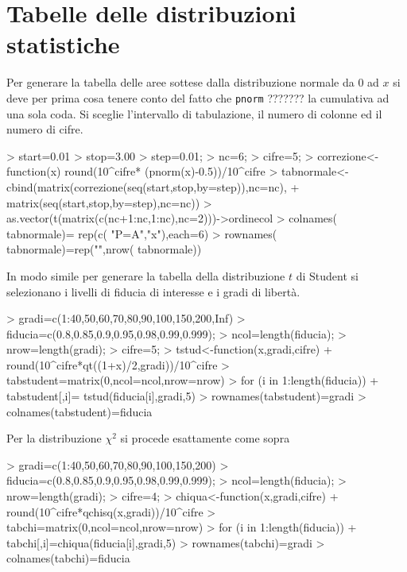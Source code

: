 \documentclass[onecolumn,11pt]{book}
\begin{document}
\section*{Tabelle delle distribuzioni statistiche}
Per generare la tabella delle aree sottese dalla distribuzione normale da 0 ad $x$ si deve per prima cosa tenere conto del fatto che \texttt{pnorm} ??????? la cumulativa ad una sola coda. Si sceglie l'intervallo di tabulazione, il numero di colonne ed il numero di cifre.
\begin{Schunk}
\begin{Sinput}
> start=0.01
> stop=3.00
> step=0.01;
> nc=6;
> cifre=5;
> correzione<-function(x)  round(10^cifre* (pnorm(x)-0.5))/10^cifre
>  tabnormale<-cbind(matrix(correzione(seq(start,stop,by=step)),nc=nc),
+  matrix(seq(start,stop,by=step),nc=nc))
> as.vector(t(matrix(c(nc+1:nc,1:nc),nc=2)))->ordinecol
> colnames( tabnormale)= rep(c( "P=A","x"),each=6)
> rownames( tabnormale)=rep("",nrow( tabnormale))
\end{Sinput}
\end{Schunk}
In modo simile per generare la tabella della distribuzione $t$ di Student si selezionano i livelli di fiducia di interesse e  i gradi di libert\`a.
\begin{Schunk}
\begin{Sinput}
> gradi=c(1:40,50,60,70,80,90,100,150,200,Inf)
> fiducia=c(0.8,0.85,0.9,0.95,0.98,0.99,0.999);
> ncol=length(fiducia);
> nrow=length(gradi);
> cifre=5;
> tstud<-function(x,gradi,cifre)  
+ round(10^cifre*qt((1+x)/2,gradi))/10^cifre
> tabstudent=matrix(0,ncol=ncol,nrow=nrow)
>  for (i in 1:length(fiducia)) 
+  tabstudent[,i]= tstud(fiducia[i],gradi,5)
>  rownames(tabstudent)=gradi
> colnames(tabstudent)=fiducia
\end{Sinput}
\end{Schunk}
 Per la distribuzione $\chi^2$ si procede esattamente come sopra
\begin{Schunk}
\begin{Sinput}
> gradi=c(1:40,50,60,70,80,90,100,150,200)
> fiducia=c(0.8,0.85,0.9,0.95,0.98,0.99,0.999);
> ncol=length(fiducia);
> nrow=length(gradi);
> cifre=4;
> chiqua<-function(x,gradi,cifre)  
+ round(10^cifre*qchisq(x,gradi))/10^cifre
> tabchi=matrix(0,ncol=ncol,nrow=nrow)
> for (i in 1:length(fiducia)) 
+ tabchi[,i]=chiqua(fiducia[i],gradi,5)
> rownames(tabchi)=gradi
> colnames(tabchi)=fiducia
\end{Sinput}
\end{Schunk}
\end{document}
